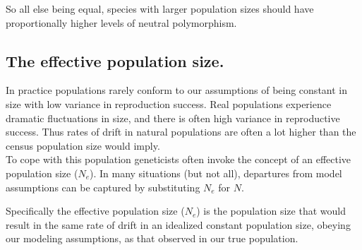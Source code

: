 So all else being equal, species with larger population sizes should
have proportionally higher levels of neutral polymorphism. 


\subsection{The effective population size.}
In practice populations rarely conform to our assumptions of being
constant in size with low variance in reproduction success. Real
populations experience dramatic fluctuations in size, and there is
often high variance in reproductive success. Thus rates of drift in
natural populations are often a lot higher than the census population
size would imply.\\

To cope with this population geneticists often invoke the concept of
an effective population size ($N_e$). In many situations (but not all), departures from model assumptions can be captured by substituting $N_e$ for $N$.

Specifically the effective population size ($N_e$) is the population
size that would result in the same rate of drift in an idealized constant
population size, obeying our modeling assumptions, as that observed in
our true population. \\

